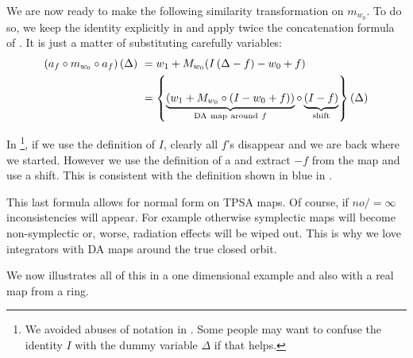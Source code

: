 \documentclass{hitec}     %
\begin{document}
{We are now ready to make the following similarity transformation on ${m}_{{w}_{0}}$. To do so, we keep the identity explicitly in  and apply twice the  concatenation formula of . It is just a matter of substituting carefully variables:
%
\begin{subequations}\begin{align} \left({{a}_{f}\circ {m}_{{w}_{0}}\circ {a}_{f}}\right)\left({\Delta }\right)\  &={w}_{1}+{M}_{{w}_{0}}(I\left({\Delta -f}\right)-{w}_{0}+f) \label{eq:simil0}\\ \ &=\left\{{\underbrace{\left({{w}_{1}+{M}_{{w}_{0}}\circ (I-{w}_{0}+f)}\right)}\limits_{{\rm D}{\rm A}~{\rm m}{\rm a}{\rm p}~{\rm a}{\rm r}{\rm o}{\rm u}{\rm n}{\rm d} ~f}^{}\circ \underbrace{\left({I-f}\right)}\limits_{{\rm s}{\rm h}{\rm i}{\rm f}{\rm t}}^{}}\right\}\left({\Delta }\right)\label{eq:simil} \end{align}\end{subequations}


%
In \footnote{We avoided  abuses of notation in . Some people may want to confuse the identity $I$ with the dummy variable $\Delta$ if that helps.}, if we use the definition of $I$, clearly all  $f$'s disappear and we are back where we started. However we use the definition of a  and extract $-f$ from the map and use a shift. This is consistent with the definition shown in blue in .

This last formula allows for normal form on TPSA maps. Of course, if $no/=\infty$ inconsistencies will appear. For example otherwise symplectic maps will become non-symplectic or, worse, radiation effects will be wiped out. This is why we love integrators with DA maps around the true closed orbit.

We now illustrates all of this in a one dimensional example and also with a real map from a ring.

}
\end{document}
